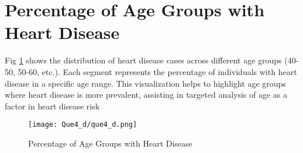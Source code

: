\documentclass{article}
\begin{document}
	\section{Percentage of Age Groups with Heart Disease}
	Fig \ref{img4} shows the distribution of heart disease cases across different age groups (40-50, 50-60, etc.). Each segment represents the percentage of individuals with heart disease in a specific age range. This visualization helps to highlight age groups where heart disease is more prevalent, assisting in targeted analysis of age as a factor in heart disease risk
	\begin{figure}[h]
		\centering
		\texttt{[image: Que4\_d/que4\_d.png]}
		\caption{Percentage of Age Groups with Heart Disease}
		\label{img4}
	\end{figure}
	
\end{document}
